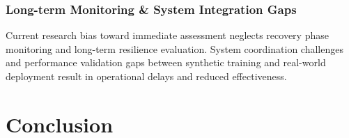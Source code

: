 \documentclass[conference,a4paper]{IEEEtran}
\begin{document}
\subsubsection{Long-term Monitoring \& System Integration Gaps}
Current research bias toward immediate assessment neglects recovery phase monitoring and long-term resilience evaluation. System coordination challenges and performance validation gaps between synthetic training and real-world deployment result in operational delays and reduced effectiveness.


\section{Conclusion}




  
\end{document}
